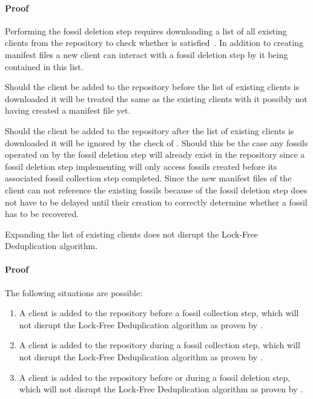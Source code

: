 \paragraph{Proof} Performing the fossil deletion step requires downloading a list
of all existing clients from the repository to check whether 
is satisfied~\cite[Algorithm 2]{Duplicacy}.
In addition to creating manifest files a new client can interact with a fossil
deletion step by it being contained in this list.

Should the client be added to the repository before the list of existing clients
is downloaded it will be treated the same as the existing clients with it possibly
not having created a manifest file yet.

Should the client be added to the repository after the list of existing clients
is downloaded it will be ignored by the check of .
Should this be the case any fossils operated on by the fossil deletion step will
already exist in the repository since a fossil deletion step implementing
 will only access fossils created before its associated
fossil collection step completed.
Since the new manifest files of the client can not reference the existing fossils
because of  the fossil deletion step does not have to be
delayed until their creation to correctly determine whether a fossil has to be
recovered.

\begin{thm}\label{thm:adding-clients}
    Expanding the list of existing clients does not disrupt the Lock-Free
    Deduplication algorithm.
\end{thm}

\paragraph{Proof} The following situations are possible:

\begin{enumerate}
    \item A client is added to the repository before a fossil collection step,
        which will not disrupt the Lock-Free Deduplication algorithm as proven
        by .

    \item A client is added to the repository during a fossil collection step,
        which will not disrupt the Lock-Free Deduplication algorithm as proven
        by .

    \item A client is added to the repository before or during a fossil deletion
        step, which will not disrupt the Lock-Free Deduplication algorithm as
        proven by .
\end{enumerate}

